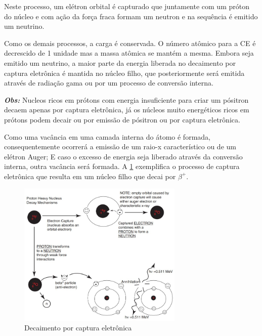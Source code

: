 \documentclass[11pt,a4paper]{article}
\begin{document}
                Neste processo, um elétron orbital é capturado que juntamente com um  próton do núcleo e com ação da força fraca formam um neutron e na sequência é emitido um neutrino.

                Como os demais processos, a carga é conservada. O número atômico para a CE é decrescido de 1 unidade mas a massa atômica se mantém a mesma. Embora seja emitido um neutrino, a maior parte da energia liberada no decaimento por captura eletrônica é mantida no núcleo filho, que posteriormente será emitida através de radiação gama ou por um processo de conversão interna.

                \textbf{\textit{\textcolor{CarnationPink}{Obs:}}} Nucleos ricos em prótons com energia insuficiente para criar um pósitron decaem apenas por captura eletrônica, já os núcleos muito energéticos ricos em prótons podem decair ou por emissão de pósitron ou por captura eletrônica.

                Como uma vacância em uma camada interna do átomo é formada, consequentemente ocorrerá a emissão de um raio-x característico ou de um elétron Auger; E caso o excesso de energia seja liberado através da conversão interna, outra vacância será formada. A \ref{fig:decaimentoPorCapturaEletronica} exemplifica o processo de captura eletrônica que resulta em um núcleo filho que decai por $\beta^+$.

                \begin{figure}[h]
                    \centering
                    \includegraphics[width=0.7\textwidth]{Imagens/decaimentoPorCapturaEletronica.jpg}
                    \caption{Decaimento por captura eletrônica}
                    \label{fig:decaimentoPorCapturaEletronica}
                \end{figure}
\end{document}
